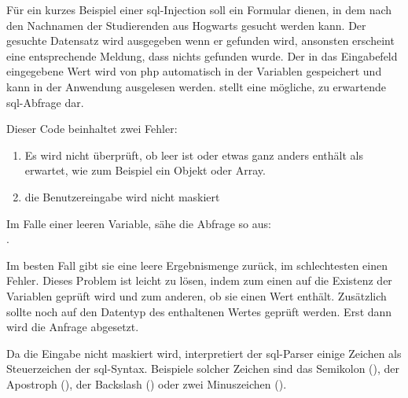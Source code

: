 Für ein kurzes Beispiel einer \gls{sql}-Injection soll ein Formular dienen, in dem nach den Nachnamen der Studierenden aus Hogwarts gesucht werden kann. Der gesuchte Datensatz wird ausgegeben wenn er gefunden wird, ansonsten erscheint eine entsprechende Meldung, dass nichts gefunden wurde. Der in das Eingabefeld eingegebene Wert wird von \gls{php} automatisch in der Variablen  gespeichert und kann in der Anwendung ausgelesen werden.  stellt eine mögliche, zu erwartende \gls{sql}-Abfrage dar.

\begin{listing}[H]
\caption{}
\label{lst:sqlInjections}
\end{listing}

Dieser Code beinhaltet zwei Fehler:

\begin{enumerate}
	\item Es wird nicht überprüft, ob  leer ist oder etwas ganz anders enthält als erwartet, wie zum Beispiel ein Objekt oder Array.
	\item die Benutzereingabe wird nicht maskiert
\end{enumerate}

Im Falle einer leeren Variable, sähe die Abfrage so aus:\\ .

Im besten Fall gibt sie eine leere Ergebnismenge zurück, im schlechtesten einen Fehler. Dieses Problem ist leicht zu lösen, indem zum einen auf die Existenz der Variablen geprüft wird und zum anderen, ob sie einen Wert enthält. Zusätzlich sollte noch auf den Datentyp des enthaltenen Wertes geprüft werden. Erst dann wird die Anfrage abgesetzt.

Da die Eingabe nicht maskiert wird, interpretiert der \gls{sql}-Parser einige Zeichen als Steuerzeichen der \gls{sql}-Syntax. Beispiele solcher Zeichen sind das Semikolon (\pdf{;}), der Apostroph (), der Backslash (\pdf{\textbackslash}) oder zwei Minuszeichen (\pdf{--}).

